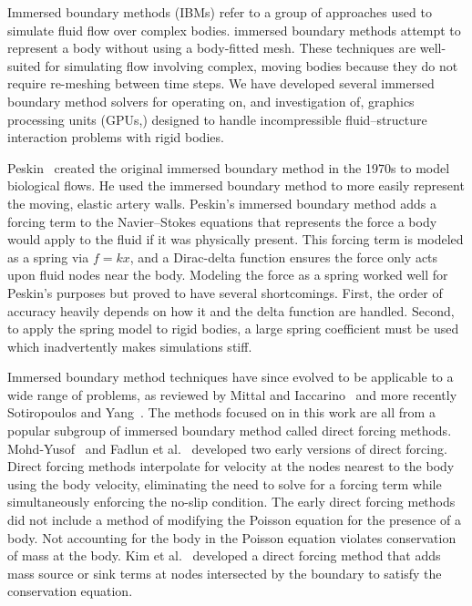 Immersed boundary methods (IBMs) refer to a group of approaches used to simulate fluid flow over complex bodies. 
immersed boundary methods attempt to represent a body without using a body-fitted mesh. 
These techniques are well-suited for simulating flow involving complex, moving bodies because they do not require re-meshing between time steps. 
We have developed several immersed boundary method solvers for operating on, and investigation of, graphics processing units (GPUs,) designed to handle incompressible fluid--structure interaction problems with rigid bodies. 

Peskin~\cite{Peskin:1972gh} created the original immersed boundary method in the 1970s to model biological flows. 
He used the immersed boundary method to more easily represent the moving, elastic artery walls. 
Peskin's immersed boundary method adds a forcing term to the Navier--Stokes equations that represents the force a body would apply to the fluid if it was physically present. 
This forcing term is modeled as a spring via $f=kx$, and a Dirac-delta function ensures the force only acts upon fluid nodes near the body. 
Modeling the force as a spring worked well for Peskin's purposes but proved to have several shortcomings. 
First, the order of accuracy heavily depends on how it and the delta function are handled. 
Second, to apply the spring model to rigid bodies, a large spring coefficient must be used which inadvertently makes simulations stiff. 

Immersed boundary method techniques have since evolved to be applicable to a wide range of problems, as reviewed by Mittal and Iaccarino~\cite{Mittal:2005ii} and more recently Sotiropoulos and Yang~\cite{Sotiropoulos:2014gv}. 
The methods focused on in this work are all from a popular subgroup of immersed boundary method called direct forcing methods. 
Mohd-Yusof~\cite{MohdYusof:1997wh} and Fadlun et al.~\cite{Fadlun:2000fl} developed two early versions of direct forcing. 
Direct forcing methods interpolate for velocity at the nodes nearest to the body using the body velocity, eliminating the need to solve for a forcing term while simultaneously enforcing the no-slip condition.
The early direct forcing methods did not include a method of modifying the Poisson equation for the presence of a body. 
Not accounting for the body in the Poisson equation violates conservation of mass at the body. 
Kim et al.~\cite{kim2001immersed} developed a direct forcing method that adds mass source or sink terms at nodes intersected by the boundary to satisfy the conservation equation. 

